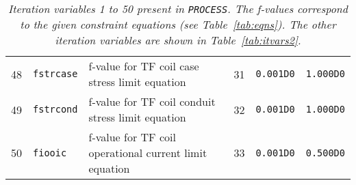 \documentclass[11pt,a4paper]{report}
\newcommand{\process}{\mbox{\texttt{PROCESS}}}
\begin{document}
\begin{table}[tbph]
\begin{center}
\begin{tabular}{||c|l|l|c|c|c||}
48  & \texttt{fstrcase} & f-value for TF coil case stress limit equation & 31  & \texttt{0.001D0} & \texttt{1.000D0} \\
49  & \texttt{fstrcond} & f-value for TF coil conduit stress limit equation & 32  & \texttt{0.001D0} & \texttt{1.000D0} \\
50  & \texttt{fiooic}   & f-value for TF coil operational current limit equation & 33  & \texttt{0.001D0} & \texttt{0.500D0} \\
\hline
\end{tabular}
\end{center}
\caption[List of iteration variables 1 to 50]
{\label{tab:itvars1}
  \textit{Iteration variables 1 to 50 present in \process. The f-values correspond to the
    given constraint equations (see Table~\ref{tab:eqns}). The other iteration
    variables are shown in Table~\ref{tab:itvars2}.}
}
\end{table}
\normalsize
\end{document}
